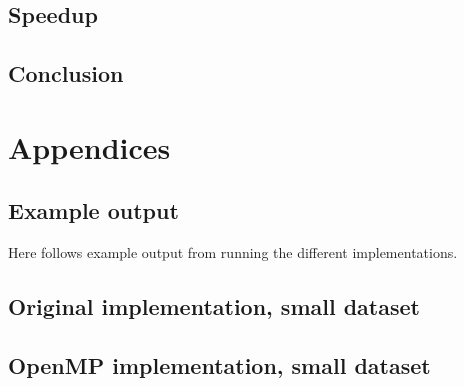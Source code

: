 \documentclass[11pt]{article}
\begin{document}
\subsection{Speedup}
\begin{table}[h]
\centering
{}
\caption{Speedup comparison of the original implementation, the OpenMP implementation and the CUDA implementation}
\label{table:cudatime}
\end{table}

\subsection{Conclusion}

\newpage
\section{Appendices}
\subsection{Example output}
Here follows example output from running the different implementations.

\subsection{Original implementation, small dataset}

\subsection{OpenMP implementation, small dataset}

\end{document}
